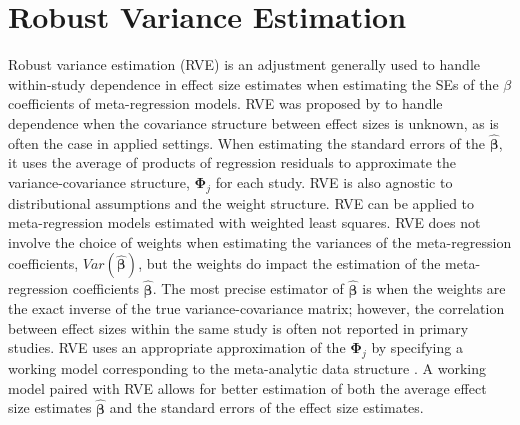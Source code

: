\section{Robust Variance Estimation}

Robust variance estimation (RVE) is an adjustment generally used to handle within-study dependence in effect size estimates when estimating the SEs of the $\beta$ coefficients of meta-regression models. RVE was proposed by \textcite{hedges2010} to handle dependence when the covariance structure between effect sizes is unknown, as is often the case in applied settings. When estimating the standard errors of the $\bm{\hat{\beta}}$, it uses the average of products of regression residuals to approximate the variance-covariance structure, $\mathbf{\Phi}_j$ for each study. RVE is also agnostic to distributional assumptions and the weight structure. RVE can be applied to meta-regression models estimated with weighted least squares. RVE does not involve the choice of weights when estimating the variances of the meta-regression coefficients, $Var(\bm{\hat{\beta}})$, but the weights do impact the estimation of the meta-regression coefficients $\bm{\hat{\beta}}$. The most precise estimator of $\bm{\hat{\beta}}$ is when the weights are the exact inverse of the true variance-covariance matrix; however, the correlation between effect sizes within the same study is often not reported in primary studies. RVE uses an appropriate approximation of the $\mathbf{\Phi}_j$ by specifying a working model corresponding to the meta-analytic data structure \autocite{pustejovsky2022}. A working model paired with RVE allows for better estimation of both the average effect size estimates $\bm{\hat{\beta}}$ and the standard errors of the effect size estimates. 



